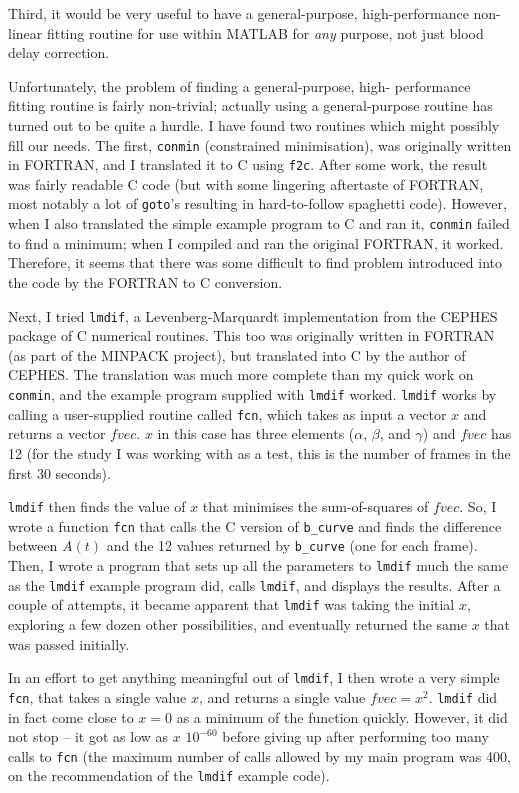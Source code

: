 Third, it would be very useful to have a general-purpose,
high-performance non-linear fitting routine for use within MATLAB for
{\em any} purpose, not just blood delay correction.

Unfortunately, the problem of finding a general-purpose, high-
performance fitting routine is fairly non-trivial; actually using a
general-purpose routine has turned out to be quite a hurdle.  I have
found two routines which might possibly fill our needs.  The first,
\verb|conmin| (constrained minimisation), was originally written in
FORTRAN, and I translated it to C using \verb|f2c|.  After some work,
the result was fairly readable C code (but with some lingering
aftertaste of FORTRAN, most notably a lot of \verb|goto|'s resulting
in hard-to-follow spaghetti code).  However, when I also translated
the simple example program to C and ran it, \verb|conmin| failed to
find a minimum; when I compiled and ran the original FORTRAN, it
worked.  Therefore, it seems that there was some difficult to find
problem introduced into the code by the FORTRAN to C conversion.

Next, I tried \verb|lmdif|, a Levenberg-Marquardt implementation from
the CEPHES package of C numerical routines.  This too was originally
written in FORTRAN (as part of the MINPACK project), but translated
into C by the author of CEPHES.  The translation was much more
complete than my quick work on \verb|conmin|, and the example program
supplied with \verb|lmdif| worked.  \verb|lmdif| works by calling
a user-supplied routine called \verb|fcn|, which takes as input a
vector $x$ and returns a vector $fvec$.  $x$ in this case has three
elements ($\alpha$, $\beta$, and $\gamma$) and $fvec$ has 12 (for the
study I was working with as a test, this is the number of frames in
the first 30 seconds).

\verb|lmdif| then finds the value of $x$ that minimises the sum-of-squares of
$fvec$.  So, I wrote a function \verb|fcn| that calls the C version of
\verb|b_curve| and finds the difference between $A(t)$ and the 12 values
returned by \verb|b_curve| (one for each frame).  Then, I wrote a
program that sets up all the parameters to \verb|lmdif| much the same
as the \verb|lmdif| example program did, calls \verb|lmdif|, and
displays the results.  After a couple of attempts, it became apparent
that \verb|lmdif| was taking the initial $x$, exploring a few dozen
other possibilities, and eventually returned the same $x$ that was
passed initially.

In an effort to get anything meaningful out of \verb|lmdif|, I then
wrote a very simple \verb|fcn|, that takes a single value $x$, and
returns a single value $fvec = x^{2}$.  \verb|lmdif| did in fact come
close to $x=0$ as a minimum of the function quickly.  However, it did
not stop -- it got as low as $x$ $10^{-60}$ before giving up after
performing too many calls to \verb|fcn| (the maximum number of calls
allowed by my main program was 400, on the recommendation of the
\verb|lmdif| example code).

